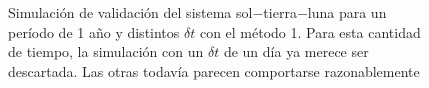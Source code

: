 \begin{figure}
{	\label{fig:ej1_m1_365_12}
	}
	\caption{
		Simulación de validación del sistema sol$-$tierra$-$luna para un período de 1 año y distintos $\delta t$
		con el método 1.
		Para esta cantidad de tiempo, la simulación con un $\delta t$ de un día ya merece ser descartada.
		Las otras todavía parecen comportarse razonablemente
	}
	\label{ fig:res_ej1_m1_365 }
\end{figure}
